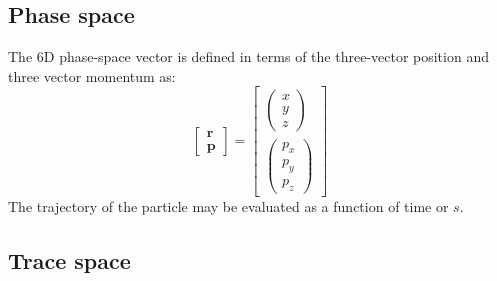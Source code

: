 \subsection{Phase space}

The 6D phase-space vector is defined in terms of the three-vector
position and three vector momentum as:
\begin{equation}
  \begin{bmatrix} \bm{r} \\ \bm{p} \end{bmatrix} = 
  \begin{bmatrix} \begin{pmatrix} x   \\   y \\ z   \end{pmatrix} \\
                  \begin{pmatrix} p_x \\ p_y \\ p_z \end{pmatrix} \end{bmatrix}
\end{equation}
The trajectory of the particle may be evaluated as a function of time
or $s$.

\subsection{Trace space}

